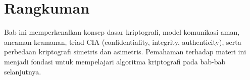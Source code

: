 \section*{Rangkuman}
Bab ini memperkenalkan konsep dasar kriptografi, model komunikasi aman, ancaman keamanan, triad CIA (confidentiality, integrity, authenticity), serta perbedaan kriptografi simetris dan asimetris. Pemahaman terhadap materi ini menjadi fondasi untuk mempelajari algoritma kriptografi pada bab-bab selanjutnya.
